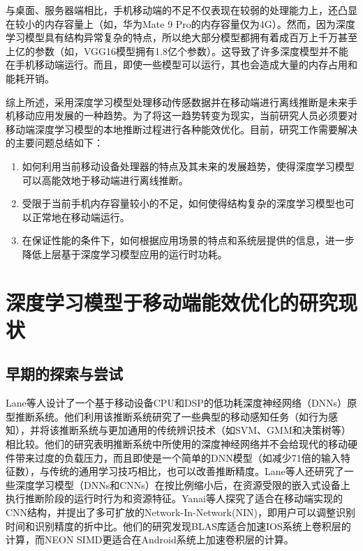 与桌面、服务器端相比，手机移动端的不足不仅表现在较弱的处理能力上，还凸显在较小的内存容量上（如，华为Mate 9 Pro的内存容量仅为4G）。然而，因为深度学习模型具有结构异常复杂的特点，所以绝大部分模型都拥有着成百万上千万甚至上亿的参数（如，VGG16\cite{simonyan2014very}模型拥有1.8亿个参数）。这导致了许多深度模型并不能在手机移动端运行。而且，即使一些模型可以运行，其也会造成大量的内存占用和能耗开销。

综上所述，采用深度学习模型处理移动传感数据并在移动端进行离线推断是未来手机移动应用发展的一种趋势。为了将这一趋势转变为现实，当前研究人员必须要对移动端深度学习模型的本地推断过程进行各种能效优化。目前，研究工作需要解决的主要问题总结如下：

\begin{enumerate}
\item  如何利用当前移动设备处理器的特点及其未来的发展趋势，使得深度学习模型可以高能效地于移动端进行离线推断。
\item 受限于当前手机内存容量较小的不足，如何使得结构复杂的深度学习模型也可以正常地在移动端运行。
\item 在保证性能的条件下，如何根据应用场景的特点和系统层提供的信息，进一步降低上层基于深度学习模型应用的运行时功耗。
\end{enumerate}

\section{深度学习模型于移动端能效优化的研究现状}
\subsection{早期的探索与尝试}
Lane等人\cite{lane2015can}设计了一个基于移动设备CPU和DSP的低功耗深度神经网络（DNNs）\cite{deng2013new}原型推断系统。他们利用该推断系统研究了一些典型的移动感知任务（如行为感知），并将该推断系统与更加通用的传统辨识技术（如SVM、GMM和决策树等）相比较。他们的研究表明推断系统中所使用的深度神经网络并不会给现代的移动硬件带来过度的负载压力，而且即使是一个简单的DNN模型（如减少71倍的输入特征数），与传统的通用学习技巧相比，也可以改善推断精度。Lane等人\cite{lane2015early}还研究了一些深度学习模型（DNNs和CNNs）在按比例缩小后，在资源受限的嵌入式设备上执行推断阶段的运行时行为和资源特征。Yanai等人\cite{yanai2016efficient}探究了适合在移动端实现的CNN结构，并提出了多可扩放的Network-In-Network(NIN)\cite{lin2013network}，即用户可以调整识别时间和识别精度的折中比。他们的研究发现BLAS库适合加速IOS系统上卷积层的计算，而NEON SIMD\cite{mitra2013use}更适合在Android系统上加速卷积层的计算。
